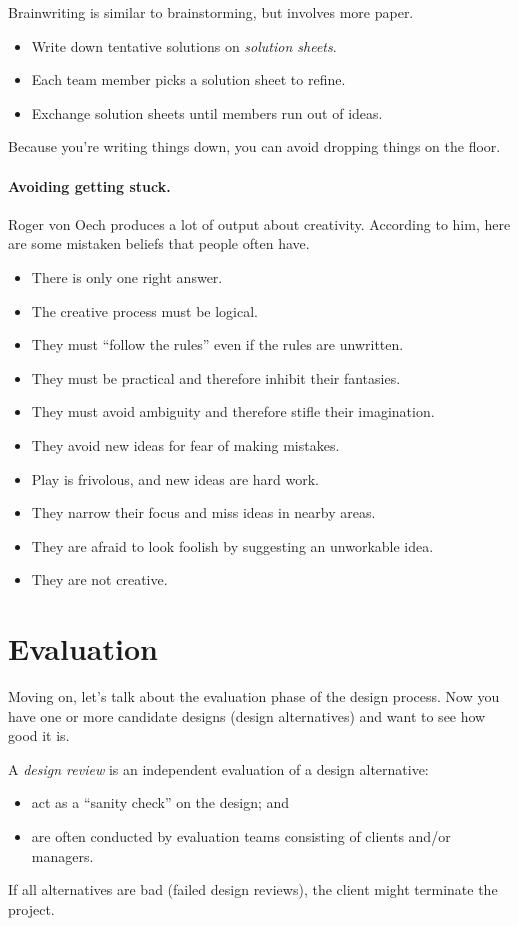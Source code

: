 Brainwriting is similar to brainstorming, but involves more paper.
\begin{itemize}
\item Write down tentative solutions on \emph{solution sheets}.
\item Each team member picks a solution sheet to refine.
\item Exchange solution sheets until members run out of ideas.
\end{itemize}
Because you're writing things down, you can avoid dropping things on the floor.

\paragraph{Avoiding getting stuck.} Roger von 
Oech \cite{creativeThink} produces a lot of
output about creativity. According to him, here are some mistaken
beliefs that people often have.

\begin{itemize}
\item There is only one right answer.
\item The creative process must be logical.
\item They must ``follow the rules'' even if the rules are unwritten.
\item They must be practical and therefore inhibit their fantasies.
\item They must avoid ambiguity and therefore stifle their imagination.
\item They avoid new ideas for fear of making mistakes.
\item Play is frivolous, and new ideas are hard work.
\item They narrow their focus and miss ideas in nearby areas.
\item They are afraid to look foolish by suggesting an unworkable idea.
\item They are not creative.
\end{itemize}

\section*{Evaluation}
Moving on, let's talk about the evaluation phase of the design
process.  Now you have one or more candidate designs (design
alternatives) and want to see how good it is.

A \emph{design review} is an independent evaluation of a design alternative:
\begin{itemize}
\item act as a ``sanity check'' on the design; and 
\item are often conducted by evaluation teams consisting of clients and/or
managers.
\end{itemize}
If all alternatives are bad (failed design reviews), the client might
terminate the project.


